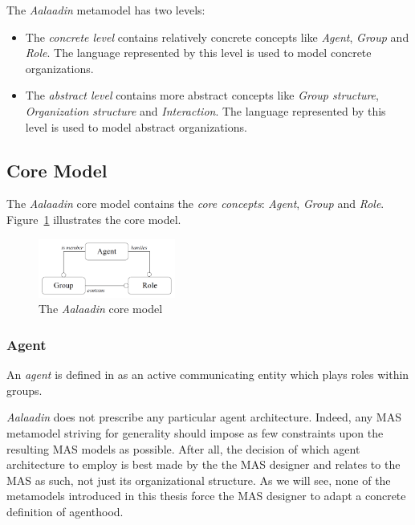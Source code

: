 The \textit{Aalaadin} metamodel has two levels:
\begin{itemize}
	\item The \textit{concrete level} contains relatively concrete concepts like \textit{Agent}, \textit{Group} and \textit{Role}.
	The language represented by this level is used to model concrete organizations.
	\item The \textit{abstract level} contains more abstract concepts like \textit{Group structure}, \textit{Organization structure} and \textit{Interaction}.
	The language represented by this level is used to model abstract organizations.
\end{itemize}

\subsection{Core Model}

The \textit{Aalaadin} core model contains the \textit{core concepts}: \textit{Agent}, \textit{Group} and \textit{Role}.
Figure~\ref{figure:aalaadin-core-model} illustrates the core model.

\begin{figure}[h]
	\centering
	\includegraphics[width=0.4\textwidth]{images/aalaadin/core-model.png}
	\caption{The \textit{Aalaadin} core model \cite{Ferber97}}
	\label{figure:aalaadin-core-model}
\end{figure}

\subsubsection*{Agent}

An \textit{agent} is defined in \cite{Ferber97} as an active communicating entity which plays roles within groups.

\textit{Aalaadin} does not prescribe any particular agent architecture.
Indeed, any MAS metamodel striving for generality should impose as few constraints upon the resulting MAS models as possible.
After all, the decision of which agent architecture to employ is best made by the the MAS designer and relates to the MAS as such, not just its organizational structure.
As we will see, none of the metamodels introduced in this thesis force the MAS designer to adapt a concrete definition of agenthood.

